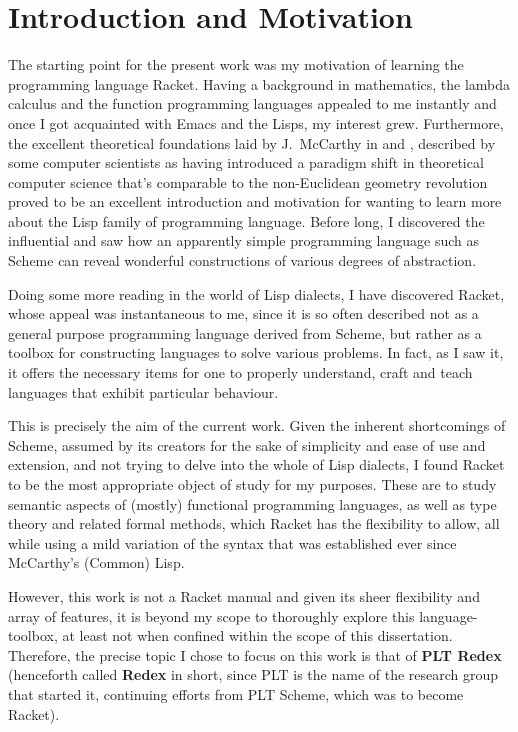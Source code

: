 \chapter*{Introduction and Motivation}

The starting point for the present work was my motivation of learning
the programming language Racket. Having a background in mathematics,
the lambda calculus and the function programming languages appealed to
me instantly and once I got acquainted with Emacs and the Lisps, my
interest grew. Furthermore, the excellent theoretical foundations laid
by J.\ McCarthy in \cite{mccarthy62} and \cite{mccarthy61}, described
by some computer scientists as having introduced a paradigm shift in
theoretical computer science that's comparable to the non-Euclidean
geometry revolution proved to be an excellent introduction and motivation
for wanting to learn more about the Lisp family of programming language.
Before long, I discovered the influential \cite{sicp} and saw how an
apparently simple programming language such as Scheme can reveal wonderful
constructions of various degrees of abstraction.

Doing some more reading in the world of Lisp dialects, I have discovered
Racket, whose appeal was instantaneous to me, since it is so often described
not as a general purpose programming language derived from Scheme, but rather
as a toolbox for constructing languages to solve various problems. In fact,
as I saw it, it offers the necessary items for one to properly understand,
craft and teach languages that exhibit particular behaviour.

This is precisely the aim of the current work. Given the inherent shortcomings
of Scheme, assumed by its creators for the sake of simplicity and ease of
use and extension, and not trying to delve into the whole  of Lisp
dialects, I found Racket to be the most appropriate object of study for my
purposes. These are to study semantic aspects of (mostly) functional programming
languages, as well as type theory and related formal methods, which Racket
has the flexibility to allow, all while using a mild variation of the syntax
that was established ever since McCarthy's (Common) Lisp.

However, this work is not a Racket manual and given its sheer flexibility
and array of features, it is beyond my scope to thoroughly explore this
language-toolbox, at least not when confined within the scope of this
dissertation. Therefore, the precise topic I chose to focus on this work is
that of \textbf{PLT Redex} (henceforth called \textbf{Redex} in short, since
PLT is the name of the research group that started it, continuing efforts from
PLT Scheme, which was to become Racket).


